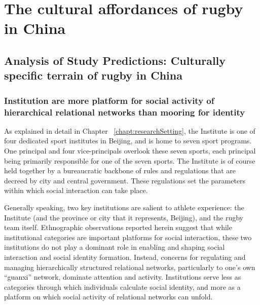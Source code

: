 \chapter{\label{chap:ethnoField} The cultural affordances of rugby in China}

\minitoc




                                      \begin{CJK}{UTF8}{gbsn}




\section{Analysis of Study Predictions: Culturally specific terrain of rugby in China}

\subsection{Institution are more platform for social activity of hierarchical relational networks than mooring for identity \label{sect:institutionPlatform}}

As explained in detail in Chapter ~\ref{chapt:researchSetting}, the Institute is one of four dedicated sport institutes in Beijing, and is home to seven sport programs.  One principal and four vice-principals overlook these seven sports, each principal being primarily responsible for one of the seven sports.  The Institute is of course held together by a bureaucratic backbone of rules and regulations that are decreed by city and central government.  These regulations set the parameters within which social interaction can take place.

Generally speaking, two key institutions are salient to athlete experience: the Institute (and the province or city that it represents, Beijing), and the rugby team itself.  Ethnographic observations reported herein suggest that while institutional categories are important platforms for social interaction, these two institutions do not play a dominant role in enabling and shaping social interaction and social identity formation.  Instead, concerns for regulating and managing hierarchically structured relational networks, particularly to one's own ``guanxi'' network, dominate attention and activity.  Institutions serve less as categories through which individuals calculate social identity, and more as a platform on which social activity of relational networks can unfold.


\end{CJK}
